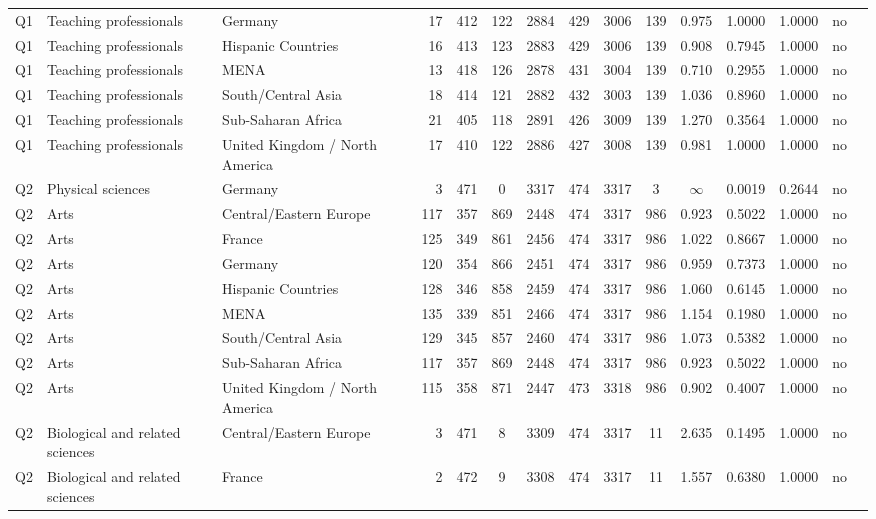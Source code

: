 \begin{longtable}{lllrcccccccccll}
Q1 & Teaching professionals & Germany & 17 & 412 & 122 & 2884 & 429 & 3006 & 139 & 0.975 & 1.0000 & 1.0000 & no \\
Q1 & Teaching professionals & Hispanic Countries & 16 & 413 & 123 & 2883 & 429 & 3006 & 139 & 0.908 & 0.7945 & 1.0000 & no \\
Q1 & Teaching professionals & MENA & 13 & 418 & 126 & 2878 & 431 & 3004 & 139 & 0.710 & 0.2955 & 1.0000 & no \\
Q1 & Teaching professionals & South/Central Asia & 18 & 414 & 121 & 2882 & 432 & 3003 & 139 & 1.036 & 0.8960 & 1.0000 & no \\
Q1 & Teaching professionals & Sub-Saharan Africa & 21 & 405 & 118 & 2891 & 426 & 3009 & 139 & 1.270 & 0.3564 & 1.0000 & no \\
Q1 & Teaching professionals & United Kingdom / North America & 17 & 410 & 122 & 2886 & 427 & 3008 & 139 & 0.981 & 1.0000 & 1.0000 & no \\
Q2 & Physical sciences & Germany & 3 & 471 & 0 & 3317 & 474 & 3317 & 3 & $\infty$ & 0.0019 & 0.2644 & no \\
Q2 & Arts & Central/Eastern Europe & 117 & 357 & 869 & 2448 & 474 & 3317 & 986 & 0.923 & 0.5022 & 1.0000 & no \\
Q2 & Arts & France & 125 & 349 & 861 & 2456 & 474 & 3317 & 986 & 1.022 & 0.8667 & 1.0000 & no \\
Q2 & Arts & Germany & 120 & 354 & 866 & 2451 & 474 & 3317 & 986 & 0.959 & 0.7373 & 1.0000 & no \\
Q2 & Arts & Hispanic Countries & 128 & 346 & 858 & 2459 & 474 & 3317 & 986 & 1.060 & 0.6145 & 1.0000 & no \\
Q2 & Arts & MENA & 135 & 339 & 851 & 2466 & 474 & 3317 & 986 & 1.154 & 0.1980 & 1.0000 & no \\
Q2 & Arts & South/Central Asia & 129 & 345 & 857 & 2460 & 474 & 3317 & 986 & 1.073 & 0.5382 & 1.0000 & no \\
Q2 & Arts & Sub-Saharan Africa & 117 & 357 & 869 & 2448 & 474 & 3317 & 986 & 0.923 & 0.5022 & 1.0000 & no \\
Q2 & Arts & United Kingdom / North America & 115 & 358 & 871 & 2447 & 473 & 3318 & 986 & 0.902 & 0.4007 & 1.0000 & no \\
Q2 & Biological and related sciences & Central/Eastern Europe & 3 & 471 & 8 & 3309 & 474 & 3317 & 11 & 2.635 & 0.1495 & 1.0000 & no \\
Q2 & Biological and related sciences & France & 2 & 472 & 9 & 3308 & 474 & 3317 & 11 & 1.557 & 0.6380 & 1.0000 & no \\

\end{longtable}
